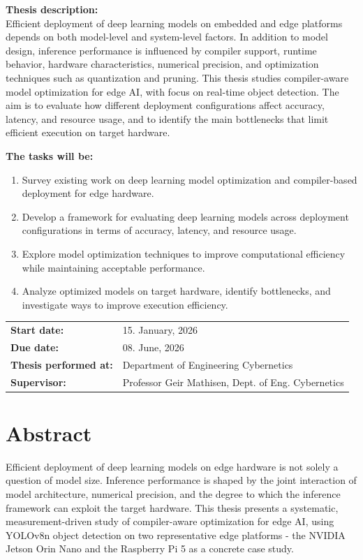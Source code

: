 \documentclass[12pt,a4paper]{report}
\newcommand{\SupervisorName}{Professor Geir Mathisen, Dept. of Eng. Cybernetics}
\newcommand{\ThesisDescription}{
    Efficient deployment of deep learning models on embedded and edge platforms depends on
    both model-level and system-level factors. In addition to model design, inference
    performance is influenced by compiler support, runtime behavior, hardware
    characteristics, numerical precision, and optimization techniques such as quantization
    and pruning. This thesis studies compiler-aware model optimization for edge AI,
    with focus on real-time object detection. The aim is to evaluate how different
    deployment configurations affect accuracy, latency, and resource usage, and to
    identify the main bottlenecks that limit efficient execution on target hardware.
}
\newcommand{\TaskLit}{
    Survey existing work on deep learning model optimization and compiler-based deployment for edge hardware.
}
\newcommand{\TaskOne}{
    Develop a framework for evaluating deep learning models across deployment configurations in terms of accuracy,
    latency, and resource usage.
}
\newcommand{\TaskTwo}{
    Explore model optimization techniques to improve computational efficiency while maintaining acceptable performance.
}
\newcommand{\TaskThree}{
    Analyze optimized models on target hardware, identify bottlenecks, and investigate ways to improve execution
    efficiency.
}
\newcommand{\StartDate}{15. January, 2026}
\newcommand{\DueDate}{08. June, 2026}
\newcommand{\ThesisLocation}{Department of Engineering Cybernetics}
\begin{document}
\begin{titlepage}
    \vspace{0.4cm}

    \noindent\textbf{Thesis description:}\\[0.2cm]
    \noindent\ThesisDescription

    \vspace{0.4cm}

    \noindent\textbf{The tasks will be:}
    \vspace{-0.2cm}
    \begin{enumerate}[leftmargin=*, topsep=0pt, partopsep=0pt, parsep=0pt, itemsep=3pt]
        \item \TaskLit
        \item \TaskOne
        \item \TaskTwo
        \item \TaskThree
    \end{enumerate}

    \vspace{0.6cm}

    \noindent
    \begin{tabular}{@{}p{4.8cm}p{13.2cm}@{}}
        \textbf{Start date:}             & \StartDate \\[0.1cm]
        \textbf{Due date:}               & \DueDate \\[0.1cm]
        \textbf{Thesis performed at:}    & \ThesisLocation \\[0.1cm]
        \textbf{Supervisor:}             & \SupervisorName \\
    \end{tabular}

    \vfill
\end{titlepage}
\restoregeometry
\cleardoublepage


\chapter*{Abstract}

Efficient deployment of deep learning models on edge hardware is not solely a question of model size. Inference
performance is shaped by the joint interaction of model architecture, numerical precision, and the degree to which
the inference framework can exploit the target hardware. This thesis presents a systematic, measurement-driven study
of compiler-aware optimization for edge AI, using YOLOv8n object detection on two representative edge platforms - the
NVIDIA Jetson Orin Nano and the Raspberry Pi 5 as a concrete case study.
\end{document}
